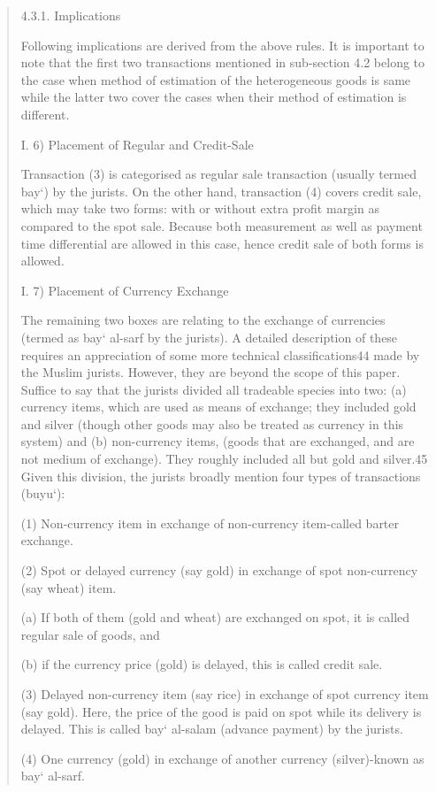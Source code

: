 \begin{quote}
4.3.1. Implications

Following implications are derived from the above rules. It is important to note that the first two transactions mentioned in sub-section 4.2 belong to the case when method of estimation of the heterogeneous goods is same while the latter two cover the cases when their method of estimation is different.

I. 6) Placement of Regular and Credit-Sale

Transaction (3) is categorised as regular sale transaction (usually termed bay‘) by the jurists. On the other hand, transaction (4) covers credit sale, which may take two forms: with or without extra profit margin as compared to the spot sale. Because both measurement as well as payment time differential are allowed in this case, hence credit sale of both forms is allowed.

I. 7) Placement of Currency Exchange

The remaining two boxes are relating to the exchange of currencies (termed as bay‘ al-sarf by the jurists). A detailed description of these requires an appreciation of some more technical classifications44 made by the Muslim jurists. However, they are beyond the scope of this paper. Suffice to say that the jurists divided all tradeable species into two: (a) currency items, which are used as means of exchange; they included gold and silver (though other goods may also be treated as currency in this system) and (b) non-currency items, (goods that are exchanged, and are not medium of exchange). They roughly included all but gold and silver.45 Given this division, the jurists broadly mention four types of transactions (buyu‘):

(1) Non-currency item in exchange of non-currency item-called barter exchange.

(2) Spot or delayed currency (say gold) in exchange of spot non-currency (say wheat) item.

(a) If both of them (gold and wheat) are exchanged on spot, it is called regular sale of goods, and

(b) if the currency price (gold) is delayed, this is called credit sale.

(3) Delayed non-currency item (say rice) in exchange of spot currency item (say gold). Here, the price of the good is paid on spot while its delivery is delayed. This is called bay‘ al-salam (advance payment) by the jurists.

(4) One currency (gold) in exchange of another currency (silver)-known as bay‘ al-sarf.


\end{quote}
